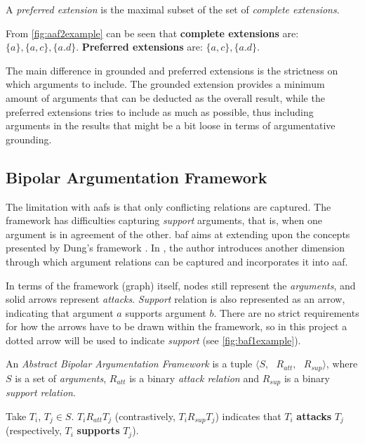             
            \begin{definition}
                A \textit{preferred extension} is the maximal subset of the set of \textit{complete extensions}.
                \label{definition:definition9}
            \end{definition}
            \begin{exa}
                From \autoref{fig:aaf2example} can be seen that \textbf{complete extensions} are: $\{a\}, \{a, c\}, \{a. d\}$. \textbf{Preferred extensions} are: $\{a, c\}, \{a. d\}$.
                \label{exa:example9}
            \end{exa}
            
            The main difference in grounded and preferred extensions is the strictness on which arguments to include. The grounded extension provides a minimum amount of arguments that can be deducted as the overall result, while the preferred extensions tries to include as much as possible, thus including arguments in the results that might be a bit loose in terms of argumentative grounding.
        
    \subsection{Bipolar Argumentation Framework}
        The limitation with \gls{aaf}s is that only conflicting relations are captured. The framework has difficulties capturing \textit{support} arguments, that is, when one argument is in agreement of the other. \gls{baf} aims at extending upon the concepts presented by Dung's framework \autocite{Dung1995OnTA}. In \autocite{Cayrol2005OnTA}, the author introduces another dimension through which argument relations can be captured and incorporates it into \gls{aaf}. 
        
        In terms of the framework (graph) itself, nodes still represent the \textit{arguments}, and solid arrows represent \textit{attacks}. \textit{Support} relation is also represented as an arrow, indicating that argument $a$ supports argument $b$. There are no strict requirements for how the arrows have to be drawn within the framework, so in this project a dotted arrow will be used to indicate \textit{support} (see \autoref{fig:baf1example}).
        
        \begin{definition}
            An \textit{Abstract Bipolar Argumentation Framework} is a tuple $\langle S, \text{ }R_{att}, \text{ }R_{sup} \rangle$, where $S$ is a set of \textit{arguments},  $R_{att}$ is a binary \textit{attack relation} and $R_{sup}$ is a binary \textit{support relation}.
            \label{definition:definition10}
        \end{definition}
        \begin{exa}
            Take $T_{i}$, $T_{j} \in S$. $T_{i}R_{att}T_{j}$ (contrastively, $T_{i}R_{sup}T_{j}$) indicates that $T_{i}$ \textbf{attacks} $T_{j}$ (respectively, $T_{i}$ \textbf{supports} $T_{j}$).
            \label{exa:example10}
        \end{exa}
        

